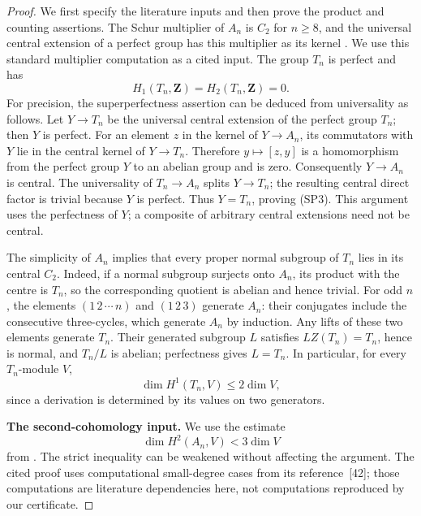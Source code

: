 \begin{proof}
We first specify the literature inputs and then prove the product
and counting assertions.  The Schur multiplier of \(A_n\) is \(C_2\)
for \(n\geq8\), and the universal central extension of a perfect group
has this multiplier as its kernel
\cite[Theorem~6.9.5 and Example~6.9.10, pp.~200--202]{Weibel1994SuperperfectB}.
We use this standard multiplier computation as a cited input.
The group \(T_n\) is perfect and has
\[
 H_1(T_n,\mathbf Z)=H_2(T_n,\mathbf Z)=0.
 \tag{SP3}
\]
For precision, the superperfectness assertion can be deduced from
universality as follows.  Let \(Y\to T_n\) be the universal central
extension of the perfect group \(T_n\); then \(Y\) is perfect.
For an element \(z\) in the kernel of \(Y\to A_n\), its commutators
with \(Y\) lie in the central kernel of \(Y\to T_n\).  Therefore
\(y\mapsto[z,y]\) is a homomorphism from the perfect group \(Y\)
to an abelian group and is zero.  Consequently \(Y\to A_n\) is
central.  The universality of \(T_n\to A_n\) splits \(Y\to T_n\);
the resulting central direct factor is trivial because \(Y\) is
perfect.  Thus \(Y=T_n\), proving (SP3).  This argument uses the
perfectness of \(Y\); a composite of arbitrary central extensions
need not be central.

The simplicity of \(A_n\) implies that every proper normal subgroup
of \(T_n\) lies in its central \(C_2\).  Indeed, if a normal subgroup
surjects onto \(A_n\), its product with the centre is \(T_n\), so
the corresponding quotient is abelian and hence trivial.
For odd \(n\), the elements
\((1\,2\,\cdots\,n)\) and \((1\,2\,3)\) generate \(A_n\):
their conjugates include the consecutive three-cycles, which
generate \(A_n\) by induction.  Any lifts of these two elements
generate \(T_n\).  Their generated subgroup \(L\) satisfies
\(LZ(T_n)=T_n\), hence is normal, and \(T_n/L\) is abelian;
perfectness gives \(L=T_n\).
In particular, for every \(T_n\)-module \(V\),
\[
 \dim H^1(T_n,V)\leq2\dim V,
 \tag{SP4}
\]
since a derivation is determined by its values on two generators.

\par\smallskip\noindent\textbf{The second-cohomology input.}\quad
We use the estimate
\[
 \dim H^2(A_n,V)<3\dim V
 \tag{SP5}
\]
from \cite[Theorem~6.2 and its proof in
Theorems~6.4, 6.5, 6.9, pp.~487--493]{GKKL2007SuperperfectB}.
The strict inequality can be weakened without affecting the argument.
The cited proof uses computational small-degree cases from its
reference~[42]; those computations are literature dependencies here,
not computations reproduced by our certificate.


\end{proof}
